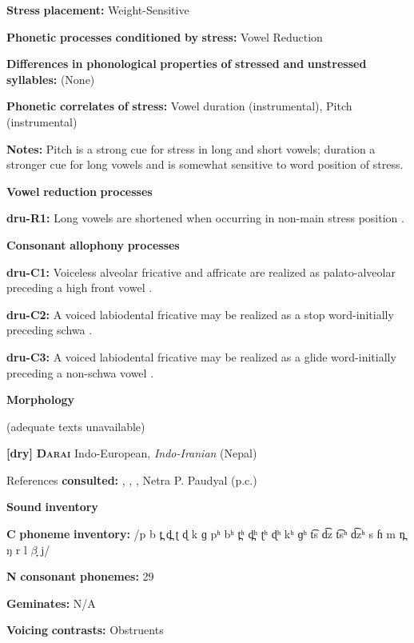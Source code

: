 \textbf{Stress} \textbf{placement:} Weight-Sensitive

\textbf{Phonetic} \textbf{processes} \textbf{conditioned} \textbf{by} \textbf{stress:} Vowel Reduction

\textbf{Differences} \textbf{in} \textbf{phonological} \textbf{properties} \textbf{of} \textbf{stressed} \textbf{and} \textbf{unstressed} \textbf{syllables:} (None)

\textbf{Phonetic} \textbf{correlates} \textbf{of} \textbf{stress:} Vowel duration (instrumental), Pitch (instrumental)

\textbf{Notes:} Pitch is a strong cue for stress in long and short vowels; duration a stronger cue for long vowels and is somewhat sensitive to word position of stress.

\textbf{Vowel} \textbf{reduction} \textbf{processes}

\textbf{dru-R1:} Long vowels are shortened when occurring in non-main stress position \citep[257]{Chen2006}.

\textbf{Consonant} \textbf{allophony} \textbf{processes}

\textbf{dru-C1:} Voiceless alveolar fricative and affricate are realized as palato-alveolar preceding a high front vowel \citep[230]{Chen2006}.

\textbf{dru-C2:} A voiced labiodental fricative may be realized as a stop word-initially preceding schwa \citep[227]{Chen2006}.

\textbf{dru-C3:} A voiced labiodental fricative may be realized as a glide word-initially preceding a non-schwa vowel \citep[227]{Chen2006}.

\textbf{Morphology}

(adequate texts unavailable)

\textbf{[dry]}   \textbf{\textsc{Darai}}    Indo-European, \textit{Indo-Iranian} (Nepal)

References \textbf{consulted:} \citet{Dhakal2012}, \citet{KotapishKotapish1973}, \citet{Paudyal2003}, Netra P. Paudyal (p.c.)

\textbf{Sound} \textbf{inventory}

\textbf{C} \textbf{phoneme} \textbf{inventory:} /p b t̪ d̪ ʈ ɖ k ɡ pʰ bʰ t̪ʰ d̪ʰ ʈʰ ɖʰ kʰ ɡʰ t͡s d͡z t͡sʰ d͡zʰ s ɦ m n̪ ŋ r l $\beta ̞$ j/

\textbf{N} \textbf{consonant} \textbf{phonemes:} 29

\textbf{Geminates:} N/A

\textbf{Voicing} \textbf{contrasts:} Obstruents

